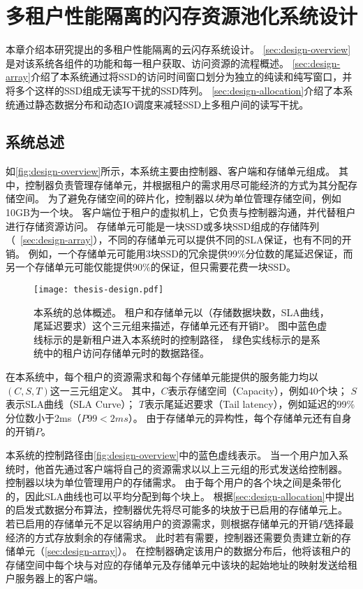 
\chapter{多租户性能隔离的闪存资源池化系统设计}
\label{chap:design}

本章介绍本研究提出的多租户性能隔离的云闪存系统设计。
\autoref{sec:design-overview}是对该系统各组件的功能和每一租户获取、访问资源的流程概述。
\autoref{sec:design-array}介绍了本系统通过将SSD的访问时间窗口划分为独立的纯读和纯写窗口，并将多个这样的SSD组成无读写干扰的SSD阵列。
\autoref{sec:design-allocation}介绍了本系统通过静态数据分布和动态IO调度来减轻SSD上多租户间的读写干扰。

\section{系统总述}
\label{sec:design-overview}

如\autoref{fig:design-overview}所示，本系统主要由控制器、客户端和存储单元组成。
其中，控制器负责管理存储单元，并根据租户的需求用尽可能经济的方式为其分配存储空间。
为了避免存储空间的碎片化，控制器以\textit{块}为单位管理存储空间，例如10GB为一个块。
客户端位于租户的虚拟机上，它负责与控制器沟通，并代替租户进行存储资源访问。
存储单元可能是一块SSD或多块SSD组成的存储阵列（~\autoref{sec:design-array}），不同的存储单元可以提供不同的SLA保证，也有不同的开销。
例如，一个存储单元可能用3块SSD的冗余提供99\%分位数的尾延迟保证，而另一个存储单元可能仅能提供90\%的保证，但只需要花费一块SSD。

\begin{figure}[h]
  \centering
  \texttt{[image: thesis-design.pdf]}
  \caption{
      本系统的总体概述。
      租户和存储单元以（存储数据块数，SLA曲线，尾延迟要求）这个三元组来描述，存储单元还有开销P。
      图中蓝色虚线标示的是新租户进入本系统时的控制路径，
      绿色实线标示的是系统中的租户访问存储单元时的数据路径。
      }
  \label{fig:design-overview}
\end{figure}

在本系统中，每个租户的资源需求和每个存储单元能提供的服务能力均以$(C, S, T)$这一三元组定义。
其中，$C$表示存储空间（Capacity），例如40个块；
$S$表示SLA曲线（SLA Curve）；
$T$表示尾延迟要求（Tail latency），例如延迟的99\%分位数小于2ms（$P99 < 2ms$）。 
由于存储单元的异构性，每个存储单元还有自身的开销$P$。

本系统的控制路径由\autoref{fig:design-overview}中的蓝色虚线表示。
当一个用户加入系统时，他首先通过客户端将自己的资源需求以以上三元组的形式发送给控制器。
控制器以块为单位管理用户的存储需求。
由于每个用户的各个块之间是条带化的\cite{patterson1988case}，因此SLA曲线也可以平均分配到每个块上。
根据\autoref{sec:design-allocation}中提出的启发式数据分布算法，控制器优先将尽可能多的块放于已启用的存储单元上。
若已启用的存储单元不足以容纳用户的资源需求，则根据存储单元的开销$P$选择最经济的方式存放剩余的存储需求。
此时若有需要，控制器还需要负责建立新的存储单元（\autoref{sec:design-array}）。
在控制器确定该用户的数据分布后，他将该租户的存储空间中每个块与对应的存储单元及存储单元中该块的起始地址的映射发送给租户服务器上的客户端。

